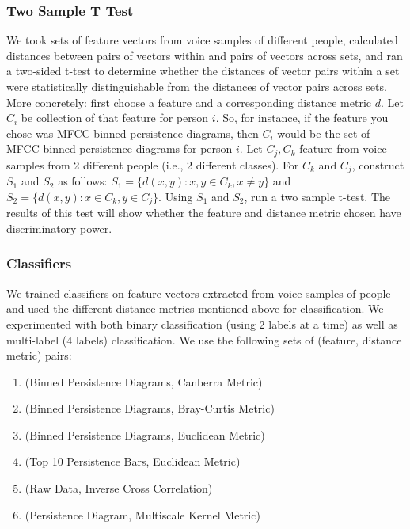 \documentclass[12pt]{article}
\begin{document}
\subsubsection{Two Sample T Test}
\-\hspace{1cm} We took sets of feature vectors from voice samples of different
people, calculated distances between pairs of vectors within and pairs of
vectors across sets, and ran a two-sided t-test to determine whether the
distances of vector pairs within a set were statistically distinguishable from
the distances of vector pairs across sets. 
\newline \-\hspace{1cm} More concretely: first choose a feature and a
corresponding distance metric $d$. Let $C_i$ be collection of that feature
for person $i$. So, for instance, if the feature you chose was MFCC binned
persistence diagrams, then $C_i$ would be the set of MFCC binned persistence
diagrams for person $i$. Let $C_j, C_k$ feature from voice samples from 2
different people (i.e., 2 different classes).
For $C_k$ and $C_j$, construct $S_1$ and $S_2$ as follows: $S_1 =
\{d(x,y) : x, y \in C_k, x \neq y\}$ and $S_2 = \{d(x,y): x \in C_k, y \in
C_j\}$. Using $S_1$ and $S_2$, run a two sample t-test. The results of this test
will show whether the feature and distance metric chosen have discriminatory
power.
\subsubsection{Classifiers}
\-\hspace{1cm} We trained classifiers on feature vectors extracted from voice
samples of people and used the different distance metrics mentioned above for
classification. We experimented with both binary classification (using 2 labels
at a time) as well as multi-label (4 labels) classification. We use the
following sets of (feature, distance metric) pairs:
\begin{enumerate}
  \item (Binned Persistence Diagrams, Canberra Metric)
  \item (Binned Persistence Diagrams, Bray-Curtis Metric)
  \item (Binned Persistence Diagrams, Euclidean Metric)
  \item (Top 10 Persistence Bars, Euclidean Metric)
  \item (Raw Data, Inverse Cross Correlation)
  \item (Persistence Diagram, Multiscale Kernel Metric)
\end{enumerate}
\end{document}
